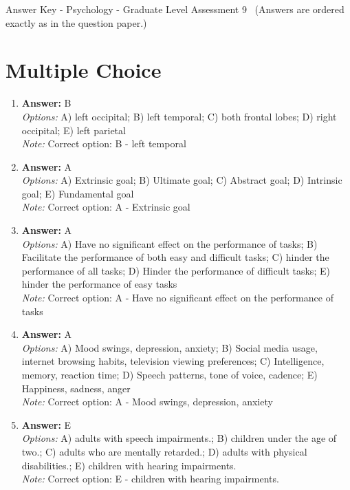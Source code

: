 \documentclass[12pt]{article}
\begin{document}
\begin{center}
Answer Key - Psychology - Graduate Level Assessment 9 \
\small (Answers are ordered exactly as in the question paper.)
\end{center}

\section*{Multiple Choice}
\begin{enumerate}[label=\arabic*.]
\item \textbf{Answer:} B
\\ \textit{Options:} A) left occipital; B) left temporal; C) both frontal lobes; D) right occipital; E) left parietal
\\ \textit{Note:} Correct option: B - left temporal
\item \textbf{Answer:} A
\\ \textit{Options:} A) Extrinsic goal; B) Ultimate goal; C) Abstract goal; D) Intrinsic goal; E) Fundamental goal
\\ \textit{Note:} Correct option: A - Extrinsic goal
\item \textbf{Answer:} A
\\ \textit{Options:} A) Have no significant effect on the performance of tasks; B) Facilitate the performance of both easy and difficult tasks; C) hinder the performance of all tasks; D) Hinder the performance of difficult tasks; E) hinder the performance of easy tasks
\\ \textit{Note:} Correct option: A - Have no significant effect on the performance of tasks
\item \textbf{Answer:} A
\\ \textit{Options:} A) Mood swings, depression, anxiety; B) Social media usage, internet browsing habits, television viewing preferences; C) Intelligence, memory, reaction time; D) Speech patterns, tone of voice, cadence; E) Happiness, sadness, anger
\\ \textit{Note:} Correct option: A - Mood swings, depression, anxiety
\item \textbf{Answer:} E
\\ \textit{Options:} A) adults with speech impairments.; B) children under the age of two.; C) adults who are mentally retarded.; D) adults with physical disabilities.; E) children with hearing impairments.
\\ \textit{Note:} Correct option: E - children with hearing impairments.
\end{enumerate}
\end{document}
